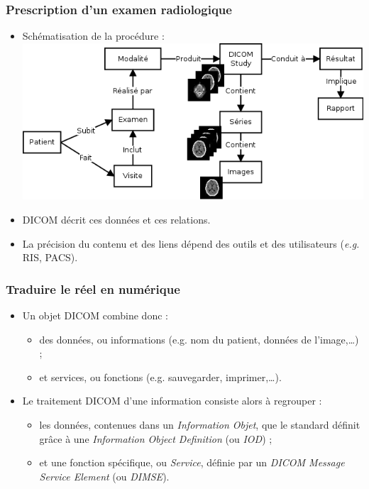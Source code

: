 	\frame
	{
		\frametitle{Prescription d'un examen radiologique}
		\begin{itemize}
			\item Sch\'ematisation de la proc\'edure :
			\includegraphics[width=\linewidth]{./figures/scenario.png}
			\item DICOM d\'ecrit ces donn\'ees et ces relations.
			\item La pr\'ecision du contenu et des liens d\'epend des outils et des utilisateurs (\emph{e.g.} RIS, PACS).
		\end{itemize}
	}

	\frame
	{
		\frametitle{Traduire le r\'eel en num\'erique}
		
		\begin{itemize}
			\item Un objet DICOM combine donc :
			\begin{itemize}
				\item des donn\'ees, ou informations (e.g. nom du patient, donn\'ees de l'image,\ldots) ;
				\item et services, ou fonctions (e.g. sauvegarder, imprimer,\ldots).
			\end{itemize}
			
			\item Le traitement DICOM d'une information consiste alors \`a regrouper :
			\begin{itemize}
				\item les donn\'ees, contenues dans un \emph{Information Objet}, que le standard d\'efinit gr\^ace \`a une \emph{Information Object Definition} (ou \emph{IOD}) ;
				\item et une fonction sp\'ecifique, ou \emph{Service}, d\'efinie par un \emph{DICOM Message Service Element} (ou \emph{DIMSE}).
			\end{itemize}
		\end{itemize}
	}
	
